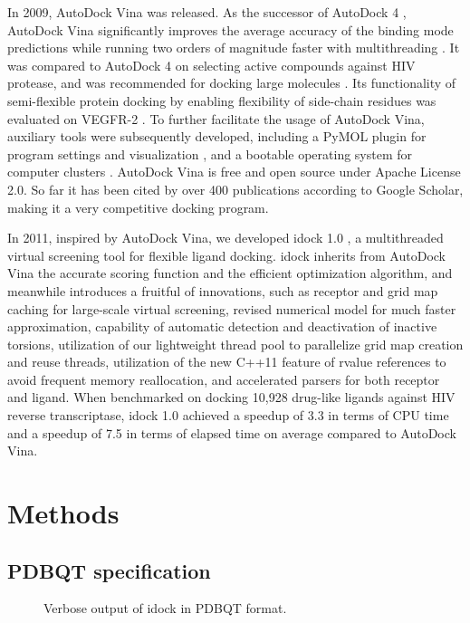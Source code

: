 In 2009, AutoDock Vina \citep{595} was released. As the successor of AutoDock 4 \citep{596}, AutoDock Vina significantly improves the average accuracy of the binding mode predictions while running two orders of magnitude faster with multithreading \citep{595}. It was compared to AutoDock 4 on selecting active compounds against HIV protease, and was recommended for docking large molecules \citep{556}. Its functionality of semi-flexible protein docking by enabling flexibility of side-chain residues was evaluated on VEGFR-2 \citep{1084}. To further facilitate the usage of AutoDock Vina, auxiliary tools were subsequently developed, including a PyMOL plugin for program settings and visualization \citep{609}, and a bootable operating system for computer clusters \citep{773}. AutoDock Vina is free and open source under Apache License 2.0. So far it has been cited by over 400 publications according to Google Scholar, making it a very competitive docking program.

In 2011, inspired by AutoDock Vina, we developed idock 1.0 \citep{1153}, a multithreaded virtual screening tool for flexible ligand docking. idock inherits from AutoDock Vina the accurate scoring function and the efficient optimization algorithm, and meanwhile introduces a fruitful of innovations, such as receptor and grid map caching for large-scale virtual screening, revised numerical model for much faster approximation, capability of automatic detection and deactivation of inactive torsions, utilization of our lightweight thread pool to parallelize grid map creation and reuse threads, utilization of the new C++11 feature of rvalue references to avoid frequent memory reallocation, and accelerated parsers for both receptor and ligand. When benchmarked on docking 10,928 drug-like ligands against HIV reverse transcriptase, idock 1.0 achieved a speedup of 3.3 in terms of CPU time and a speedup of 7.5 in terms of elapsed time on average compared to AutoDock Vina.

\section{Methods}

\subsection{PDBQT specification}

\begin{figure}
\centering
\caption{Verbose output of idock in PDBQT format.}
\label{idock:OutputPDBQT}
\end{figure}

